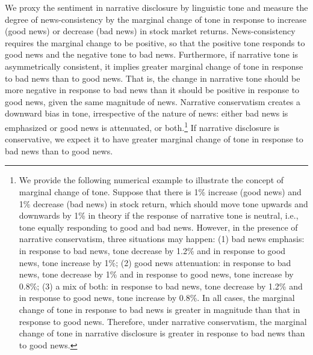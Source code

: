 \documentclass[letterpaper,11pt]{article}
\begin{document}
\begin{spacing}{1.5}
We proxy the sentiment in narrative disclosure by linguistic tone and measure the degree of news-consistency by the marginal change of tone in response to increase (good news) or decrease (bad news) in stock market returns. News-consistency requires the marginal change to be positive, so that the positive tone responds to good news and the negative tone to bad news. Furthermore, if narrative tone is asymmetrically consistent, it implies greater marginal change of tone in response to bad news than to good news. That is, the change in narrative tone should be more negative in response to bad news than it should be positive in response to good news, given the same magnitude of news. Narrative conservatism creates a downward bias in tone, irrespective of the nature of news: either bad news is emphasized or good news is attenuated, or both.\footnote{We provide the following numerical example to illustrate the concept of marginal change of tone. Suppose that there is 1\% increase (good news) and 1\% decrease (bad news) in stock return, which should move tone upwards and downwards by 1\% in theory if the response of narrative tone is neutral, i.e., tone equally responding to good and bad news. However, in the presence of narrative conservatism, three situations may happen: (1) bad news emphasis: in response to bad news, tone decrease by 1.2\% and in response to good news, tone increase by 1\%; (2) good news attenuation: in response to bad news, tone decrease by 1\% and in response to good news, tone increase by 0.8\%; (3) a mix of both: in response to bad news, tone decrease by 1.2\% and in response to good news, tone increase by 0.8\%. In all cases, the marginal change of tone in response to bad news is greater in magnitude than that in response to good news. Therefore, under narrative conservatism, the marginal change of tone in narrative disclosure is greater in response to bad news than to good news.} If narrative disclosure is conservative, we expect it to have greater marginal change of tone in response to bad news than to good news.


\end{spacing}
\end{document}

